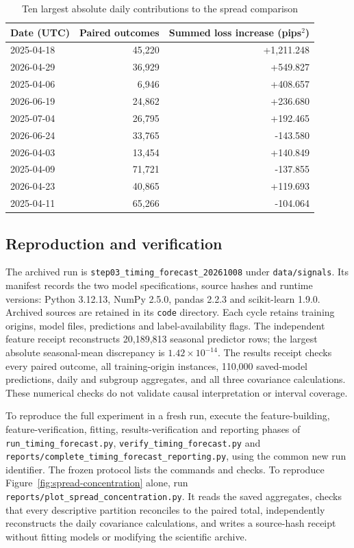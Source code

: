 \documentclass[12pt,letterpaper]{article}
\begin{document}
\begin{table}[tbp]
\centering\small
\caption{Ten largest absolute daily contributions to the spread comparison}
\label{tab:spread-days}
\begin{tabular}{lrr}
\toprule
Date (UTC) & Paired outcomes & Summed loss increase (pips$^2$) \\
\midrule
2025-04-18 & 45,220 & +1,211.248 \\
2026-04-29 & 36,929 & +549.827 \\
2025-04-06 & 6,946 & +408.657 \\
2026-06-19 & 24,862 & +236.680 \\
2025-07-04 & 26,795 & +192.465 \\
2026-06-24 & 33,765 & -143.580 \\
2026-04-03 & 13,454 & +140.849 \\
2025-04-09 & 71,721 & -137.855 \\
2026-04-23 & 40,865 & +119.693 \\
2025-04-11 & 65,266 & -104.064 \\
\bottomrule
\end{tabular}
\end{table}

\subsection{Reproduction and verification}

The archived run is \texttt{step03\_timing\_forecast\_20261008} under \texttt{data/signals}. Its manifest records the two model specifications, source hashes and runtime versions: Python 3.12.13, NumPy 2.5.0, pandas 2.2.3 and scikit-learn 1.9.0. Archived sources are retained in its \texttt{code} directory. Each cycle retains training origins, model files, predictions and label-availability flags. The independent feature receipt reconstructs 20,189,813 seasonal predictor rows; the largest absolute seasonal-mean discrepancy is $1.42\times10^{-14}$. The results receipt checks every paired outcome, all training-origin instances, 110,000 saved-model predictions, daily and subgroup aggregates, and all three covariance calculations. These numerical checks do not validate causal interpretation or interval coverage.

To reproduce the full experiment in a fresh run, execute the feature-building, feature-verification, fitting, results-verification and reporting phases of \texttt{run\_timing\_forecast.py}, \texttt{verify\_timing\_forecast.py} and \texttt{reports/complete\_timing\_forecast\_reporting.py}, using the common new run identifier. The frozen protocol lists the commands and checks. To reproduce Figure~\ref{fig:spread-concentration} alone, run \texttt{reports/plot\_spread\_concentration.py}. It reads the saved aggregates, checks that every descriptive partition reconciles to the paired total, independently reconstructs the daily covariance calculations, and writes a source-hash receipt without fitting models or modifying the scientific archive.
\end{document}
